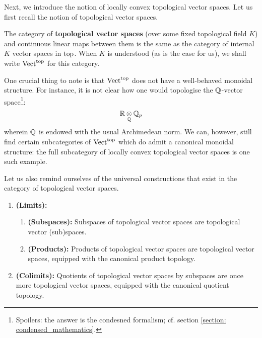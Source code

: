                 Next, we introduce the notion of locally convex topological vector spaces. Let us first recall the notion of topological vector spaces.
                \begin{definition} \label{def: topological_vector_spaces}
                    The category of \textbf{topological vector spaces} (over some fixed topological field $K$) and continuous linear maps between them is the same as the category of internal $K$ vector spaces in $\mathrm{top}$. When $K$ is understood (as is the case for us), we shall write $\mathrm{Vect}^{\mathrm{top}}$ for this category. 
                \end{definition}
                \begin{remark}
                    One crucial thing to note is that $\mathrm{Vect}^{\mathrm{top}}$ does not have a well-behaved monoidal structure. For instance, it is not clear how one would topologise the $\mathbb{Q}$-vector space\footnote{Spoilers: the answer is the condesned formalism; cf. section \ref{section: condensed_mathematics}.}:
                        $$\R \tensor_{\Q} \Q_p$$
                    wherein $\mathbb{Q}$ is endowed with the usual Archimedean norm. We can, however, still find certain subcategories of $\mathrm{Vect}^{\mathrm{top}}$ which do admit a canonical monoidal structure: the full subcategory of locally convex topological vector spaces is one such example. 
                \end{remark}
                Let us also remind ourselves of the universal constructions that exist in the category of topological vector spaces.
                \begin{proposition} \label{prop: (co)limits_of_topological_vector_spaces}
                    \noindent
                    \begin{enumerate}
                        \item \textbf{(Limits):} 
                            \begin{enumerate}
                                \item \textbf{(Subspaces):} Subspaces of topological vector spaces are topological vector (sub)spaces. 
                                \item \textbf{(Products):} Products of topological vector spaces are topological vector spaces, equipped with the canonical product topology.
                            \end{enumerate}
                        \item \textbf{(Colimits):} Quotients of topological vector spaces by subspaces are once more topological vector spaces, equipped with the canonical quotient topology.
                    \end{enumerate}
                \end{proposition}
